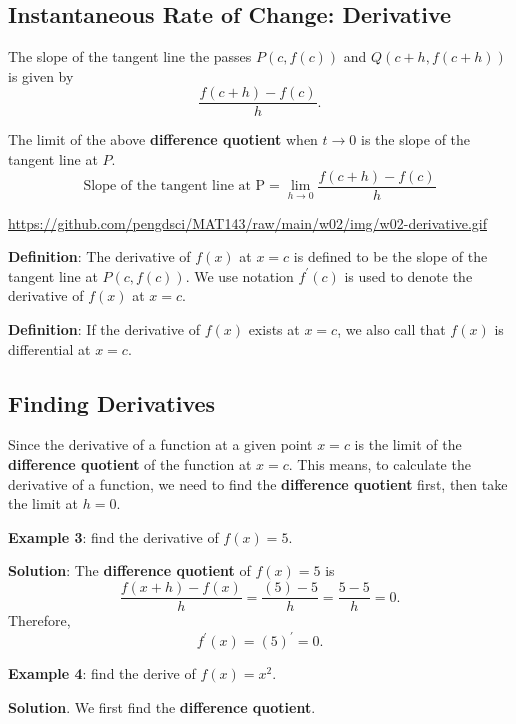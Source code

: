 \documentclass[
]{book}
\begin{document}
\hfill\break

\hypertarget{instantaneous-rate-of-change-derivative}{%
\subsection{Instantaneous Rate of Change: Derivative}\label{instantaneous-rate-of-change-derivative}}

The slope of the tangent line the passes \(P(c, f(c))\) and \(Q(c+h, f(c+h))\) is given by
\[
\frac{f(c+h) - f(c)}{h}.
\]

The limit of the above \textbf{difference quotient} when \(t \to 0\) is the slope of the tangent line at \(P\).
\[
\text{Slope of the tangent line at P} = \lim_{h \to 0} \frac{f(c+h) - f(c)}{h}
\]

\hfill\break

\url{https://github.com/pengdsci/MAT143/raw/main/w02/img/w02-derivative.gif}

\textbf{Definition}: The derivative of \(f(x)\) at \(x = c\) is defined to be the slope of the tangent line at \(P(c, f(c))\). We use notation \(f^\prime(c)\) is used to denote the derivative of \(f(x)\) at \(x = c\).

\textbf{Definition}: If the derivative of \(f(x)\) exists at \(x = c\), we also call that \(f(x)\) is differential at \(x = c\).

\hfill\break

\hypertarget{finding-derivatives}{%
\subsection{Finding Derivatives}\label{finding-derivatives}}

Since the derivative of a function at a given point \(x = c\) is the limit of the \textbf{difference quotient} of the function at \(x = c\). This means, to calculate the derivative of a function, we need to find the \textbf{difference quotient} first, then take the limit at \(h = 0\).

\textbf{Example 3}: find the derivative of \(f(x) = 5\).

\textbf{Solution}: The \textbf{difference quotient} of \(f(x) = 5\) is
\[
\frac{f(x+h) - f(x)}{h} = \frac{(5) - 5}{h} = \frac{5-5}{h} = 0.
\]
Therefore,
\[
f^\prime(x) = (5)^\prime = 0.
\]

\hfill\break

\textbf{Example 4}: find the derive of \(f(x) = x^2\).

\textbf{Solution}. We first find the \textbf{difference quotient}.
\end{document}

